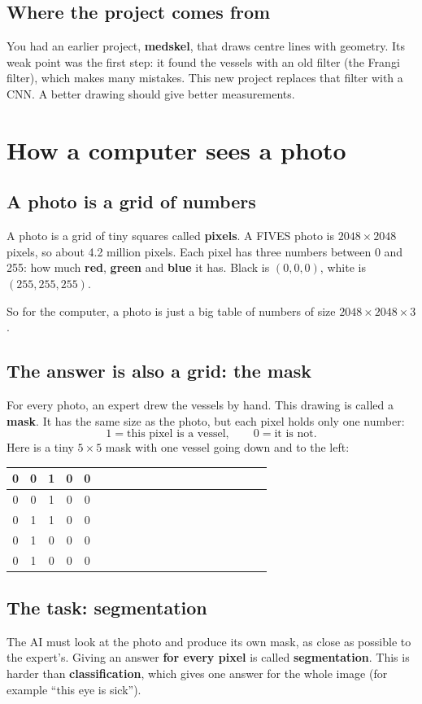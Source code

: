 \documentclass[11pt,a4paper]{article}
\newcommand{\grid}[1]{\begingroup\renewcommand{\arraystretch}{1.1}\begin{tabular}{|*{20}{c|}}\hline #1 \\\hline\end{tabular}\endgroup}
\begin{document}
\subsection{Where the project comes from}
You had an earlier project, \textbf{medskel}, that draws centre lines with geometry. Its weak point was the first step: it found the vessels with an old filter (the Frangi filter), which makes many mistakes. This new project replaces that filter with a CNN. A better drawing should give better measurements.

\section{How a computer sees a photo}

\subsection{A photo is a grid of numbers}
A photo is a grid of tiny squares called \textbf{pixels}. A FIVES photo is $2048 \times 2048$ pixels, so about 4.2 million pixels. Each pixel has three numbers between 0 and 255: how much \textbf{red}, \textbf{green} and \textbf{blue} it has. Black is $(0,0,0)$, white is $(255,255,255)$.

So for the computer, a photo is just a big table of numbers of size $2048 \times 2048 \times 3$.

\subsection{The answer is also a grid: the mask}
For every photo, an expert drew the vessels by hand. This drawing is called a \textbf{mask}. It has the same size as the photo, but each pixel holds only one number:
\[
1 = \text{this pixel is a vessel}, \qquad 0 = \text{it is not.}
\]
Here is a tiny $5\times5$ mask with one vessel going down and to the left:
\begin{center}
\grid{0&0&1&0&0\\\hline 0&0&1&0&0\\\hline 0&1&1&0&0\\\hline 0&1&0&0&0\\\hline 0&1&0&0&0}
\end{center}

\subsection{The task: segmentation}
The AI must look at the photo and produce its own mask, as close as possible to the expert's. Giving an answer \textbf{for every pixel} is called \textbf{segmentation}. This is harder than \textbf{classification}, which gives one answer for the whole image (for example ``this eye is sick'').
\end{document}
